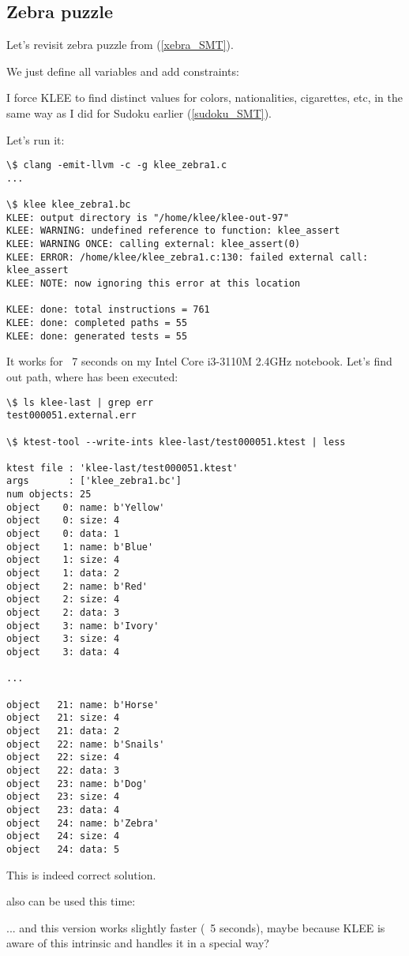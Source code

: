 \subsection{Zebra puzzle}

Let's revisit zebra puzzle from (\ref{xebra_SMT}).

We just define all variables and add constraints:



I force KLEE to find distinct values for colors, nationalities, cigarettes, etc, in the same way as I did for Sudoku earlier 
(\ref{sudoku_SMT}).

Let's run it:

\begin{lstlisting}
\$ clang -emit-llvm -c -g klee_zebra1.c
...

\$ klee klee_zebra1.bc
KLEE: output directory is "/home/klee/klee-out-97"
KLEE: WARNING: undefined reference to function: klee_assert
KLEE: WARNING ONCE: calling external: klee_assert(0)
KLEE: ERROR: /home/klee/klee_zebra1.c:130: failed external call: klee_assert
KLEE: NOTE: now ignoring this error at this location

KLEE: done: total instructions = 761
KLEE: done: completed paths = 55
KLEE: done: generated tests = 55
\end{lstlisting}

It works for ~7 seconds on my Intel Core i3-3110M 2.4GHz notebook.
Let's find out path, where  has been executed:

\begin{lstlisting}
\$ ls klee-last | grep err
test000051.external.err

\$ ktest-tool --write-ints klee-last/test000051.ktest | less

ktest file : 'klee-last/test000051.ktest'
args       : ['klee_zebra1.bc']
num objects: 25
object    0: name: b'Yellow'
object    0: size: 4
object    0: data: 1
object    1: name: b'Blue'
object    1: size: 4
object    1: data: 2
object    2: name: b'Red'
object    2: size: 4
object    2: data: 3
object    3: name: b'Ivory'
object    3: size: 4
object    3: data: 4

...

object   21: name: b'Horse'
object   21: size: 4
object   21: data: 2
object   22: name: b'Snails'
object   22: size: 4
object   22: data: 3
object   23: name: b'Dog'
object   23: size: 4
object   23: data: 4
object   24: name: b'Zebra'
object   24: size: 4
object   24: data: 5
\end{lstlisting}

This is indeed correct solution.

 also can be used this time:



... and this version works slightly faster (~5 seconds), %
maybe because KLEE is aware of this intrinsic and handles it in a special way?

